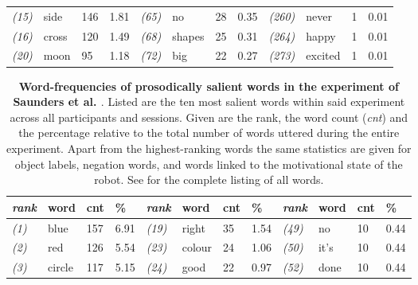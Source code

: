 \begin{screenonly}
\begin{table*}[h]
\begin{tabular*}{\hsize}{@{\extracolsep{\fill}}llllllllllll}
    \textsl{(15)} & side & 146 & 1.81 & \hspace*{2ex}\textsl{(65)} & no & 28 & 0.35 & \hspace*{2ex}\textsl{(260)} & never & 1 & 0.01\\
    \textsl{(16)} & cross & 120 & 1.49 & \hspace*{2ex}\textsl{(68)} & shapes & 25 & 0.31 & \hspace*{2ex}\textsl{(264)} & happy & 1 & 0.01\\
    \textsl{(20)} & moon & 95 & 1.18 & \hspace*{2ex}\textsl{(72)} & big & 22 & 0.27 & \hspace*{2ex}\textsl{(273)} & excited & 1 & 0.01\\
    \bottomrule
  \end{tabular*}
\end{table*}
\begin{table*}[h]
\caption{\textbf{Word-frequencies of prosodically salient words in the experiment of Saunders et al. \cite{Saunders2012}}. Listed are the ten most salient
    words within said experiment across all participants and sessions. Given are the rank, the word count (\emph{cnt}) and the
    percentage relative to the total number of words uttered during the entire experiment. Apart from the highest-ranking words the same
    statistics are given for object labels, negation words, and words linked to the motivational state of the robot.
    See \cite{Foerster2013} for the complete listing of all words.}
  \label{tbl_wf_ss}
  \begin{tabular*}{\hsize}{@{\extracolsep{\fill}}llllllllllll}
    \textsl{rank} & word & cnt & \% & \hspace*{2ex}\textsl{rank} & word & cnt & \% & \hspace*{2ex}\textsl{rank} & word & cnt & \% \\
    \toprule
    \textsl{(1)} & blue & 157 & 6.91 & \hspace*{2ex}\textsl{(19)} & right & 35 & 1.54 & \hspace*{2ex}\textsl{(49)} & no & 10 & 0.44 \\
    \textsl{(2)} & red & 126 & 5.54 & \hspace*{2ex}\textsl{(23)} & colour & 24 & 1.06 & \hspace*{2ex}\textsl{(50)} & it's & 10 & 0.44 \\
    \textsl{(3)} & circle & 117 & 5.15 & \hspace*{2ex}\textsl{(24)} & good & 22 & 0.97 & \hspace*{2ex}\textsl{(52)} & done & 10 & 0.44 \\

\end{tabular*}
\end{table*}
\end{screenonly}
